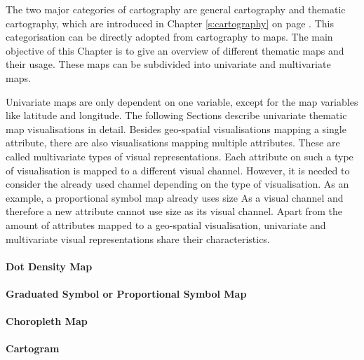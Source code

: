 The two major categories of cartography are general cartography and thematic cartography, which are introduced in Chapter \ref{s:cartography} on page \pageref{s:cartography}. This categorisation can be directly adopted from cartography to maps. The main objective of this Chapter is to give an overview of different thematic maps and their usage. These maps can be subdivided into univariate and multivariate maps.

\cbstart
Univariate maps are only dependent on one variable, except for the map variables like latitude and longitude. The following Sections describe univariate thematic map visualisations in detail. Besides geo-spatial visualisations mapping a single attribute, there are also visualisations mapping multiple attributes. These are called multivariate types of visual representations. Each attribute on such a type of visualisation is mapped to a different visual channel. However, it is needed to consider the already used channel depending on the type of visualisation. As an example, a proportional symbol map already uses size As a visual channel and therefore a new attribute cannot use size as its visual channel.
Apart from the amount of attributes mapped to a geo-spatial visualisation, univariate and multivariate visual representations share their characteristics.
\cbend

\paragraph{Dot Density Map}
\label{s:dot}


\paragraph{Graduated Symbol or Proportional Symbol Map}


\paragraph{Choropleth Map}

\label{s:choropleth}

\paragraph{Cartogram}

